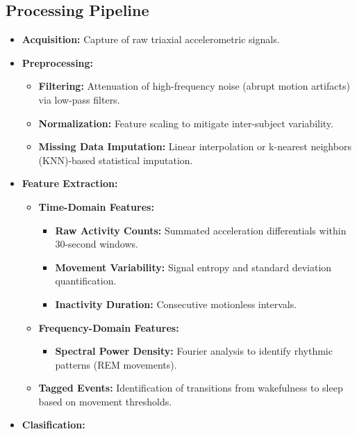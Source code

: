 \documentclass[conference]{IEEEtran}
\begin{document}
\subsection{Processing Pipeline}
\begin{itemize}
	\item \textbf{Acquisition:}
	      Capture of raw triaxial accelerometric signals.
	\item \textbf{Preprocessing:}
            \begin{itemize}
		      \item \textbf{Filtering:} Attenuation of high-frequency noise (abrupt motion artifacts) via low-pass filters.
              
		      \item \textbf{Normalization:} Feature scaling to mitigate inter-subject variability.
                \item \textbf{Missing Data Imputation:} Linear interpolation or k-nearest neighbors (KNN)-based statistical imputation.
	      \end{itemize}
    \item \textbf{Feature Extraction:}
            \begin{itemize}
		      \item \textbf{Time-Domain Features:}
                    \begin{itemize}
		              \item \textbf{Raw Activity Counts:}  Summated acceleration differentials within 30-second windows.
		              \item \textbf{Movement Variability:} Signal entropy and standard deviation quantification.
                        \item \textbf{Inactivity Duration:} Consecutive motionless intervals.
	               \end{itemize}
		      \item \textbf{Frequency-Domain Features:}
                    \begin{itemize}
                        \item \textbf{Spectral Power Density:} Fourier analysis to identify rhythmic patterns (REM movements).
                    \end{itemize}
                \item \textbf{Tagged Events:} Identification of transitions from wakefulness to sleep based on movement thresholds.
	      \end{itemize}
    \item \textbf{Clasification:}

\end{itemize}
\end{document}
